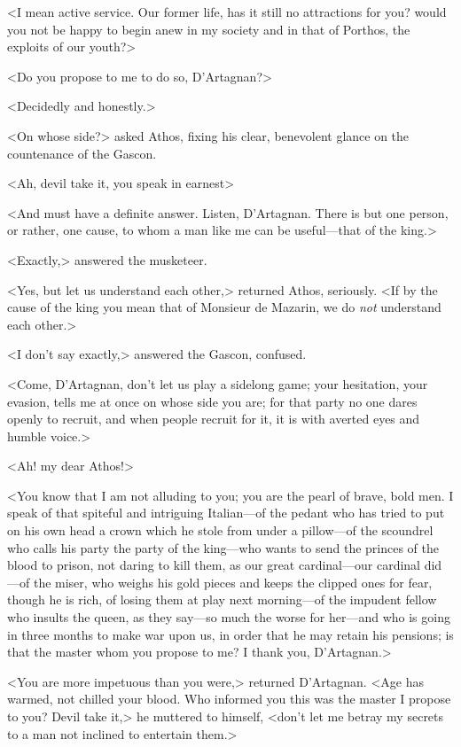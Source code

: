 <I mean active service. Our former life, has it still no attractions for you? would you not be happy to begin anew in my society and in that of Porthos, the exploits of our youth?>

<Do you propose to me to do so, D'Artagnan?>

<Decidedly and honestly.>

<On whose side?> asked Athos, fixing his clear, benevolent glance on the countenance of the Gascon.

<Ah, devil take it, you speak in earnest\longdash>

<And must have a definite answer. Listen, D'Artagnan. There is but one person, or rather, one cause, to whom a man like me can be useful—that of the king.>

<Exactly,> answered the musketeer.

<Yes, but let us understand each other,> returned Athos, seriously. <If by the cause of the king you mean that of Monsieur de Mazarin, we do \emph{not} understand each other.>

<I don't say exactly,> answered the Gascon, confused.

<Come, D'Artagnan, don't let us play a sidelong game; your hesitation, your evasion, tells me at once on whose side you are; for that party no one dares openly to recruit, and when people recruit for it, it is with averted eyes and humble voice.>

<Ah! my dear Athos!>

<You know that I am not alluding to you; you are the pearl of brave, bold men. I speak of that spiteful and intriguing Italian—of the pedant who has tried to put on his own head a crown which he stole from under a pillow—of the scoundrel who calls his party the party of the king—who wants to send the princes of the blood to prison, not daring to kill them, as our great cardinal—our cardinal did—of the miser, who weighs his gold pieces and keeps the clipped ones for fear, though he is rich, of losing them at play next morning—of the impudent fellow who insults the queen, as they say—so much the worse for her—and who is going in three months to make war upon us, in order that he may retain his pensions; is that the master whom you propose to me? I thank you, D'Artagnan.>

<You are more impetuous than you were,> returned D'Artagnan. <Age has warmed, not chilled your blood. Who informed you this was the master I propose to you? Devil take it,> he muttered to himself, <don't let me betray my secrets to a man not inclined to entertain them.>

